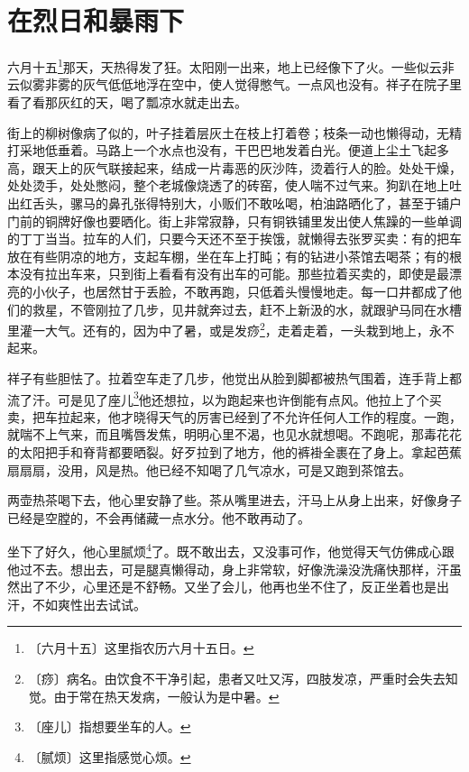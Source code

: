 \documentclass[12pt,UTF-8,openany]{ctexbook}
\begin{document}
\chapter{在烈日和暴雨下}

\begin{normalsize}
    
    六月十五\footnote{〔六月十五〕这里指农历六月十五日。}那天，天热得发了狂。太阳刚一出来，地上已经像下了火。一些似云非云似雾非雾的灰气低低地浮在空中，使人觉得憋气。一点风也没有。祥子在院子里看了看那灰红的天，喝了瓢凉水就走出去。
    
    街上的柳树像病了似的，叶子挂着层灰土在枝上打着卷；枝条一动也懒得动，无精打采地低垂着。马路上一个水点也没有，干巴巴地发着白光。便道上尘土飞起多高，跟天上的灰气联接起来，结成一片毒恶的灰沙阵，烫着行人的脸。处处干燥，处处烫手，处处憋闷，整个老城像烧透了的砖窑，使人喘不过气来。狗趴在地上吐出红舌头，骡马的鼻孔张得特别大，小贩们不敢吆喝，柏油路晒化了，甚至于铺户门前的铜牌好像也要晒化。街上非常寂静，只有铜铁铺里发出使人焦躁的一些单调的丁丁当当。拉车的人们，只要今天还不至于挨饿，就懒得去张罗买卖：有的把车放在有些阴凉的地方，支起车棚，坐在车上打盹；有的钻进小茶馆去喝茶；有的根本没有拉出车来，只到街上看看有没有出车的可能。那些拉着买卖的，即使是最漂亮的小伙子，也居然甘于丢脸，不敢再跑，只低着头慢慢地走。每一口井都成了他们的救星，不管刚拉了几步，见井就奔过去，赶不上新汲的水，就跟驴马同在水槽里灌一大气。还有的，因为中了暑，或是发痧\footnote{〔痧〕病名。由饮食不干净引起，患者又吐又泻，四肢发凉，严重时会失去知觉。由于常在热天发病，一般认为是中暑。}，走着走着，一头栽到地上，永不起来。
    
    祥子有些胆怯了。拉着空车走了几步，他觉出从脸到脚都被热气围着，连手背上都流了汗。可是见了座儿\footnote{〔座儿〕指想要坐车的人。}他还想拉，以为跑起来也许倒能有点风。他拉上了个买卖，把车拉起来，他才晓得天气的厉害已经到了不允许任何人工作的程度。一跑，就喘不上气来，而且嘴唇发焦，明明心里不渴，也见水就想喝。不跑呢，那毒花花的太阳把手和脊背都要晒裂。好歹拉到了地方，他的裤褂全裹在了身上。拿起芭蕉扇扇扇，没用，风是热。他已经不知喝了几气凉水，可是又跑到茶馆去。
    
    两壶热茶喝下去，他心里安静了些。茶从嘴里进去，汗马上从身上出来，好像身子已经是空膛的，不会再储藏一点水分。他不敢再动了。
    
    坐下了好久，他心里腻烦\footnote{〔腻烦〕这里指感觉心烦。}了。既不敢出去，又没事可作，他觉得天气仿佛成心跟他过不去。想出去，可是腿真懒得动，身上非常软，好像洗澡没洗痛快那样，汗虽然出了不少，心里还是不舒畅。又坐了会儿，他再也坐不住了，反正坐着也是出汗，不如爽性出去试试。
    

\end{normalsize}
\end{document}
